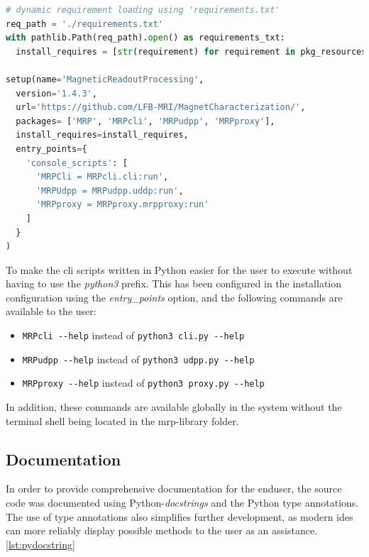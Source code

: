 \begin{lstlisting}[language=Python, caption={setup.py with dynamic requirement parsing used given requirements.txt}, label=lst:setup_py_req]
# dynamic requirement loading using 'requirements.txt'
req_path = './requirements.txt'
with pathlib.Path(req_path).open() as requirements_txt:
  install_requires = [str(requirement) for requirement in pkg_resources.parse_requirements(requirements_txt)]

setup(name='MagneticReadoutProcessing',
  version='1.4.3',
  url='https://github.com/LFB-MRI/MagnetCharacterization/',
  packages= ['MRP', 'MRPcli', 'MRPudpp', 'MRPproxy'],
  install_requires=install_requires,
  entry_points={
    'console_scripts': [
      'MRPCli = MRPcli.cli:run',
      'MRPUdpp = MRPudpp.uddp:run',
      'MRPproxy = MRPproxy.mrpproxy:run'
    ]
  }
)
\end{lstlisting}

To make the \gls{cli} scripts written in Python easier for the user to
execute without having to use the \emph{python3} prefix. This has been
configured in the installation configuration using the
\emph{entry\_points} option, and the following commands are available to
the user:

\begin{itemize}
\tightlist
\item
  \passthrough{\lstinline!MRPcli --help!} instead of
  \passthrough{\lstinline!python3 cli.py --help!}
\item
  \passthrough{\lstinline!MRPudpp --help!} instead of
  \passthrough{\lstinline!python3 udpp.py --help!}
\item
  \passthrough{\lstinline!MRPproxy --help!} instead of
  \passthrough{\lstinline!python3 proxy.py --help!}
\end{itemize}

In addition, these commands are available globally in the system without
the terminal shell being located in the \gls{mrp}-library folder.

\hypertarget{documentation}{%
\subsection{Documentation}\label{documentation}}

In order to provide comprehensive documentation for the enduser, the
source code was documented using Python-\emph{docstrings}
\cite{PythonDocstringReference} and the Python type annotations. The
use of type annotations also simplifies further development, as modern
\gls{ide}s can more reliably display possible methods to the user as an
assistance. \ref{lst:pydocstring}

